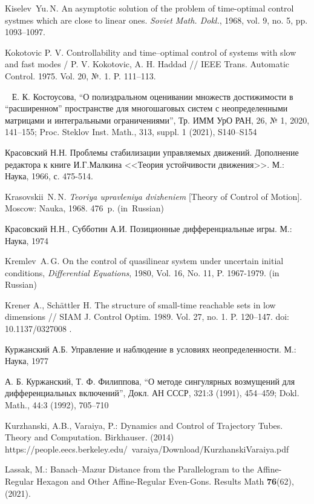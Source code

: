 \documentclass[../main.tex]{subfiles}
\begin{document}
\begin{thebibliography}{99}
Kiselev~Yu.\,N. An asymptotic solution of the problem of time-optimal control systmes which are close to
linear ones. \emph{Soviet Math. Dokl.}, 1968, vol. 9, no. 5, pp. 1093–1097.


Kokotovic P. V. Controllability and time–optimal control of systems with slow and fast modes / P. V. Kokotovic, A. H. Haddad // IEEE Trans. Automatic Control. 
1975.  Vol. 20, №. 1.  P. 111–113.

Е. К. Костоусова, “О полиэдральном оценивании множеств достижимости в “расширенном” пространстве для многошаговых систем с неопределенными матрицами и интегральными ограничениями”, Тр. ИММ УрО РАН, 26, № 1, 2020, 141–155; Proc. Steklov Inst. Math., 313, suppl. 1 (2021), S140–S154

Красовский Н.Н. Проблемы стабилизации управляемых движений. Дополнение редактора к книге И.Г.Малкина <<Теория устойчивости  движения>>. М.: Наука, 1966, с. 475-514.

{Krasovskii~N.\,N.} \emph{Teoriya upravleniya dvizheniem} [Theory of Control of Motion]. Moscow: Nauka, 1968. 476~p. (in~Russian)

Красовский Н.Н., Субботин А.И. Позиционные дифференциальные игры. М.: Наука, 1974

Kremlev~A.\,G. On the control of quasilinear system under uncertain initial conditions, \emph{Differential Equations}, 1980, Vol. 16, No. 11, P. 1967-1979. (in Russian)

Krener A., Sch\"{a}ttler H. The structure of small-time reachable sets in low dimensions // SIAM J. Control Optim. 1989. Vol. 27, no. 1. P. 120–147. doi: 10.1137/0327008 .

Куржанский А.Б. Управление и наблюдение в условиях неопределенности. М.: Наука, 1977

А. Б. Куржанский, Т. Ф. Филиппова, “О методе сингулярных возмущений для дифференциальных включений”, Докл. АН СССР, 321:3 (1991), 454–459; Dokl. Math., 44:3 (1992), 705–710

Kurzhanski, A.B., Varaiya, P.: Dynamics and Control of Trajectory Tubes. Theory and Computation. Birkhauser. (2014)\\ https://people.eecs.berkeley.edu/~varaiya/Download/KurzhanskiVaraiya.pdf

Lassak, M.: Banach–Mazur Distance from the Parallelogram to the Affine-Regular Hexagon and Other Affine-Regular Even-Gons. Results Math \textbf{76}(62), (2021). 


\end{thebibliography}
\end{document}
